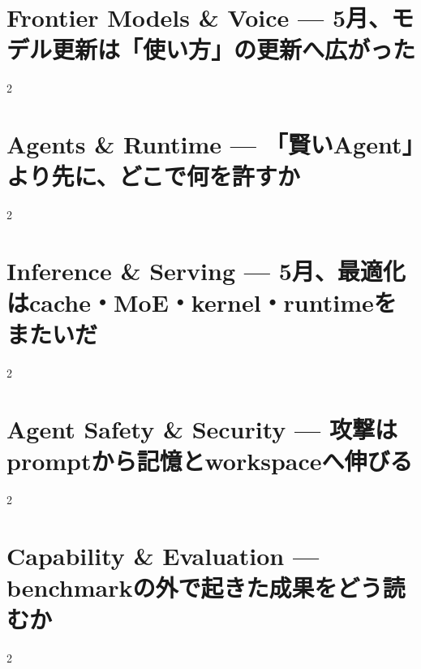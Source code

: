\documentclass[lualatex,a4paper,11pt]{jlreq}
\begin{document}
\surveycover
\clearpage


\clearpage
\section{Frontier Models \& Voice — 5月、モデル更新は「使い方」の更新へ広がった}
\label{pkg:frontier-models-may}
\vspace{0.15em}
\begin{multicols}{2}

\end{multicols}


\clearpage
\section{Agents \& Runtime — 「賢いAgent」より先に、どこで何を許すか}
\label{pkg:agents-runtime-may}
\vspace{0.15em}
\begin{multicols}{2}

\end{multicols}


\clearpage
\section{Inference \& Serving — 5月、最適化はcache・MoE・kernel・runtimeをまたいだ}
\label{pkg:inference-serving-may}
\vspace{0.15em}
\begin{multicols}{2}

\end{multicols}


\clearpage
\section{Agent Safety \& Security — 攻撃はpromptから記憶とworkspaceへ伸びる}
\label{pkg:agent-safety-security-may}
\vspace{0.15em}
\begin{multicols}{2}

\end{multicols}


\clearpage
\section{Capability \& Evaluation — benchmarkの外で起きた成果をどう読むか}
\label{pkg:capability-evaluation-may}
\vspace{0.15em}
\begin{multicols}{2}

\end{multicols}

\end{document}
